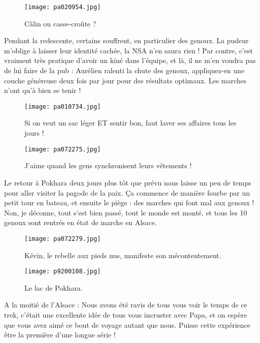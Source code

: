 \documentclass{book}
\begin{document}
\begin{figure}[h]
\centering
\texttt{[image: pa020954.jpg]}
\caption*{Câlin ou casse-croûte ?}
\end{figure}

Pendant la redescente, certains souffrent, en particulier des genoux. La pudeur m'oblige à laisser leur identité cachée, la NSA n'en saura rien ! Par contre, c'est vraiment très pratique d'avoir un kiné dans l'équipe, et là, il ne m'en voudra pas de lui faire de la pub : Aurélien ralenti la chute des genoux, appliquez-en une couche généreuse deux fois par jour pour des résultats optimaux. Les marches n'ont qu'à bien se tenir !


\begin{figure}[h]
\centering
\texttt{[image: pa010734.jpg]}
\caption*{Si on veut un sac léger ET sentir bon, faut laver ses affaires tous les jours !}
\end{figure}


\begin{figure}[h]
\centering
\texttt{[image: pa072275.jpg]}
\caption*{J'aime quand les gens synchronisent leurs vêtements !}
\end{figure}

Le retour à Pokhara deux jours plus tôt que prévu nous laisse un peu de temps pour aller visiter la pagode de la paix. Ça commence de manière fourbe par un petit tour en bateau, et ensuite le piège : des marches qui font mal aux genoux ! Non, je déconne, tout s'est bien passé, tout le monde est monté, et tous les 10 genoux sont rentrés en état de marche en Alsace.


\begin{figure}[h]
\centering
\texttt{[image: pa072279.jpg]}
\caption*{Kévin, le rebelle aux pieds nus, manifeste son mécontentement.}
\end{figure}


\begin{figure}[h]
\centering
\texttt{[image: p9200108.jpg]}
\caption*{Le lac de Pokhara.}
\end{figure}

A la moitié de l'Alsace : Nous avons été ravis de tous vous voir le temps de ce trek, c'était une excellente idée de tous vous incruster avec Papa, et on espère que vous avez aimé ce bout de voyage autant que nous. Puisse cette expérience être la première d'une longue série !
\end{document}

